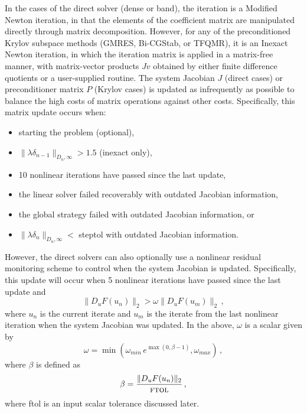 In the cases of the direct solver (dense or band), the iteration is a Modified
Newton iteration, in that the elements of the coefficient matrix are manipulated
directly through matrix decomposition. However, for any of the preconditioned Krylov
subspace methods (GMRES, Bi-CGStab, or TFQMR), it is an Inexact Newton iteration,
in which the iteration matrix is applied in a matrix-free manner, with matrix-vector
products $Jv$ obtained by either finite difference quotients or a user-supplied routine.
The system Jacobian $J$ (direct cases) or preconditioner matrix $P$ (Krylov cases)
is updated as infrequently as possible to balance the high costs of matrix
operations against other costs. Specifically, this matrix update occurs when:
\begin{itemize}
\item starting the problem (optional),
\item $\|\lambda\delta_{n-1}\|_{D_u,\infty} > 1.5$ (inexact only),
\item 10 nonlinear iterations have passed since the last update,
\item the linear solver failed recoverably with outdated Jacobian information,
\item the global strategy failed with outdated Jacobian information, or
\item $\|\lambda\delta_{n}\|_{D_u,\infty} < $ {\sc steptol} with outdated Jacobian
information.
\end{itemize}
However, the direct solvers can also optionally use a nonlinear residual monitoring
scheme to control when the system Jacobian is updated. Specifically, this update
will occur when 5 nonlinear iterations have passed since the last update and
\[ \|D_{u}F(u_n)\|_2 > \omega \|D_{u}F(u_m)\|_2 \, , \]
where $u_n$ is the current iterate and $u_m$ is the iterate from the last nonlinear
iteration when the system Jacobian was updated. In the above, $\omega$ is a scalar
given by
\begin{equation}
\omega = \min \left (\omega_{min} \, e^{\max \left ( 0 , \beta - 1 \right )} , \omega_{max}\right ) \, ,
\end{equation}
where $\beta$ is defined as
\begin{equation}
\beta = \frac{\| D_{u}F(u_n) \|_2}{\mbox{{\sc ftol}}} \, ,
\end{equation}
where {\sc ftol} is an input scalar tolerance discussed later.

